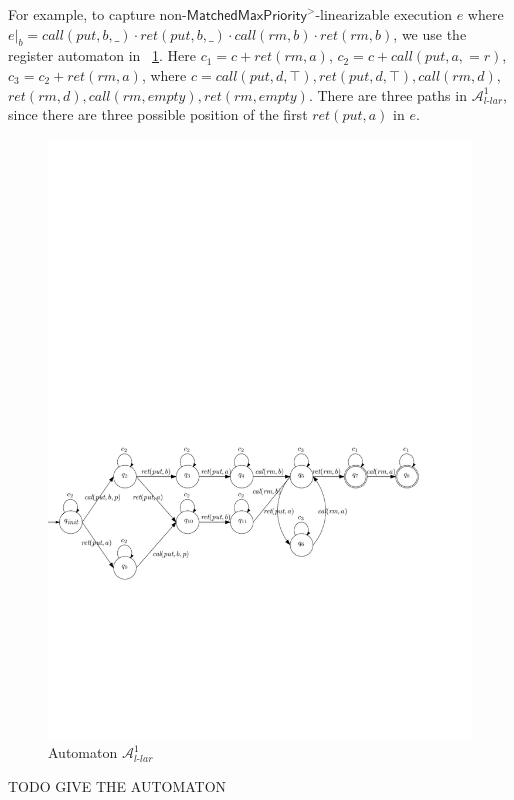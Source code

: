 {\color {blue}
For example, to capture non-$\mathsf{MatchedMaxPriority}^{>}$-linearizable execution $e$ where $e \vert_{b} = \textit{call}(\textit{put},b,\_) \cdot \textit{ret}(\textit{put},b,\_) \cdot \textit{call}(\textit{rm},b) \cdot \textit{ret}(\textit{rm},b)$, we use the register automaton in \figurename~\ref{fig:automata APQ1Lar-1 in paper}. Here $c_1 = c + \textit{ret}(\textit{rm},a)$, $c_2 = c + \textit{call}(\textit{put},a,=r)$, $c_3 = c_2 + \textit{ret}(\textit{rm},a)$, where $c = \textit{call}(\textit{put},d,\top),\textit{ret}(\textit{put},d,\top), \textit{call}(\textit{rm},d)$, $\textit{ret}(\textit{rm},d),\textit{call}(\textit{rm},\textit{empty}),\textit{ret}(\textit{rm},\textit{empty})$. There are three paths in $\mathcal{A}_{\textit{l-lar}}^1$, since there are three possible position of  the first $\textit{ret}(\textit{put},a)$ in $e$. 

\begin{figure}[htbp]
  \centering
  \includegraphics[width=1 \textwidth]{figures/PIC_AUTO_PQ1Lar-pprr.pdf}
  \caption{Automaton $\mathcal{A}_{\textit{l-lar}}^1$}
  \label{fig:automata APQ1Lar-1 in paper}
\end{figure}
}
TODO GIVE THE AUTOMATON


